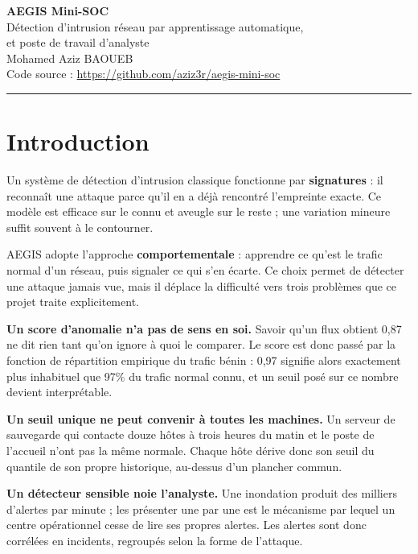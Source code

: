 \documentclass[11pt,a4paper]{article}
\begin{document}
\begin{center}
{\LARGE\bfseries AEGIS Mini-SOC}\\[2pt]
{\large Détection d'intrusion réseau par apprentissage automatique,\\et poste de travail d'analyste}\\[6pt]
{\small Mohamed Aziz BAOUEB}\\[2pt]
{\small\textcolor{gristexte}{Code source : \url{https://github.com/aziz3r/aegis-mini-soc}}}
\end{center}
\vspace{-4pt}
\rule{\linewidth}{0.8pt}

\section{Introduction}

Un système de détection d'intrusion classique fonctionne par \textbf{signatures} : il reconnaît une
attaque parce qu'il en a déjà rencontré l'empreinte exacte. Ce modèle est efficace sur le connu et
aveugle sur le reste ; une variation mineure suffit souvent à le contourner.

AEGIS adopte l'approche \textbf{comportementale} : apprendre ce qu'est le trafic normal d'un réseau,
puis signaler ce qui s'en écarte. Ce choix permet de détecter une attaque jamais vue, mais il
déplace la difficulté vers trois problèmes que ce projet traite explicitement.

\textbf{Un score d'anomalie n'a pas de sens en soi.} Savoir qu'un flux obtient 0,87 ne dit rien tant
qu'on ignore à quoi le comparer. Le score est donc passé par la fonction de répartition empirique du
trafic bénin : 0,97 signifie alors exactement \og{}plus inhabituel que 97\% du trafic normal
connu\fg{}, et un seuil posé sur ce nombre devient interprétable.

\textbf{Un seuil unique ne peut convenir à toutes les machines.} Un serveur de sauvegarde qui
contacte douze hôtes à trois heures du matin et le poste de l'accueil n'ont pas la même normale.
Chaque hôte dérive donc son seuil du quantile de son propre historique, au-dessus d'un plancher
commun.

\textbf{Un détecteur sensible noie l'analyste.} Une inondation produit des milliers d'alertes par
minute ; les présenter une par une est le mécanisme par lequel un centre opérationnel cesse de lire
ses propres alertes. Les alertes sont donc corrélées en incidents, regroupés selon la forme de
l'attaque.
\end{document}
